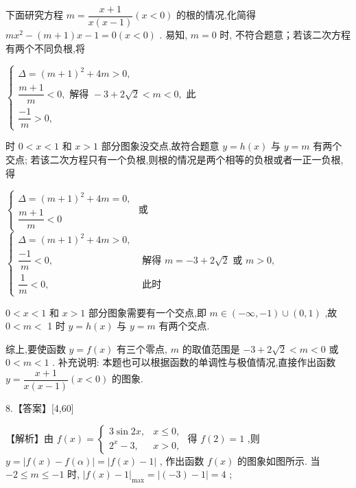 \documentclass[10pt]{article}
\begin{document}
下面研究方程 $m = \dfrac{x + 1}{x\left( {x - 1}\right) }\left( {x < 0}\right)$ 的根的情况,化简得 $m{x}^{2} - \left( {m + 1}\right) x - 1 = 0\left( {x < 0}\right)$ . 易知, $m = 0$ 时, 不符合题意；若该二次方程有两个不同负根,将

$\left\{  \begin{array}{l} \Delta  = {\left( m + 1\right) }^{2} + {4m} > 0, \\  \dfrac{m + 1}{m} < 0,\text{ 解得 } - 3 + 2\sqrt{2} < m < 0,\text{ 此 } \\  \dfrac{-1}{m} > 0, \end{array}\right.$

时 $0 < x < 1$ 和 $x > 1$ 部分图象没交点,故符合题意 $y = h\left( x\right)$ 与 $y = m$ 有两个交点; 若该二次方程只有一个负根,则根的情况是两个相等的负根或者一正一负根,得

$\left\{  \begin{array}{l} \Delta  = {\left( m + 1\right) }^{2} + {4m} = 0, \\  \dfrac{m + 1}{m} < 0 \end{array}\right.$ 或 $\left\{  \begin{array}{ll} \Delta  = {\left( m + 1\right) }^{2} + {4m} > 0, & \\  \dfrac{-1}{m} < 0, & \text{ 解得 }m =  - 3 + 2\sqrt{2}\text{ 或 }m > 0, \\  \dfrac{1}{m} < 0, & \text{ 此时 } \end{array}\right.$

$0 < x < 1$ 和 $x > 1$ 部分图象需要有一个交点,即 $m \in  \left( {-\infty , - 1}\right)  \cup  \left( {0,1}\right)$ ,故 $0 < m <$ 1 时 $y = h\left( x\right)$ 与 $y = m$ 有两个交点.

综上,要使函数 $y = f\left( x\right)$ 有三个零点, $m$ 的取值范围是 $- 3 + 2\sqrt{2} < m < 0$ 或 $0 < m < 1$ . 补充说明: 本题也可以根据函数的单调性与极值情况,直接作出函数 $y = \dfrac{x + 1}{x\left( {x - 1}\right) }\left( {x < 0}\right)$ 的图象.

8.【答案】[4,60]

【解析】由 $f\left( x\right)  = \left\{  \begin{array}{ll} 3\sin {2x}, & x \leq  0, \\  {2}^{x} - 3, & x > 0, \end{array}\right.$ 得 $f\left( 2\right)  = 1$ ,则 $y = \left| {f\left( x\right)  - f\left( \alpha \right) }\right|  = \left| {f\left( x\right)  - 1}\right|$ , 作出函数 $f\left( x\right)$ 的图象如图所示. 当 $- 2 \leq  m \leq   - 1$ 时, ${\left| f\left( x\right)  - 1\right| }_{\max } = \left| {\left( {-3}\right)  - 1}\right|  = 4$ ;
\end{document}
